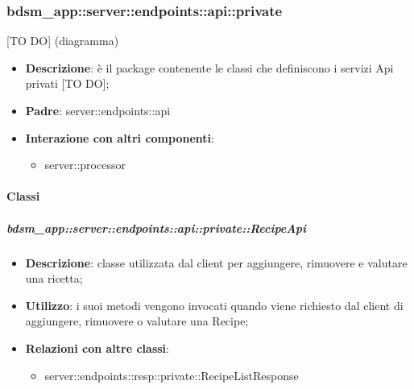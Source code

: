 \subsubsection{bdsm\_app::server::endpoints::api::private} %
\label{ssub:bdsm_app_server_endpoints_api_private}
[TO DO] (diagramma) \newline \newline

\begin{itemize}
  \item \textbf{Descrizione}: è il package contenente le classi che definiscono i servizi Api privati [TO DO];
  \item \textbf{Padre}: server::endpoints::api
  \item \textbf{Interazione con altri componenti}:
  	\begin{itemize}
        \item server::processor
    \end{itemize}
\end{itemize}

	\paragraph{Classi} %

    \subparagraph{bdsm\_app::server::endpoints::api::private::RecipeApi} %
    \label{subp:bdsm_app_server_endpoints_api_private_recipeapi}
    \begin{itemize}
      \item \textbf{Descrizione}: classe utilizzata dal client per aggiungere, rimuovere e valutare una ricetta;
      \item \textbf{Utilizzo}: i suoi metodi vengono invocati quando viene richiesto dal client di aggiungere, rimuovere o valutare una Recipe;
      \item \textbf{Relazioni con altre classi}:
        \begin{itemize}
          \item server::endpoints::resp::private::RecipeListResponse
        \end{itemize}
      \end{itemize}
    
